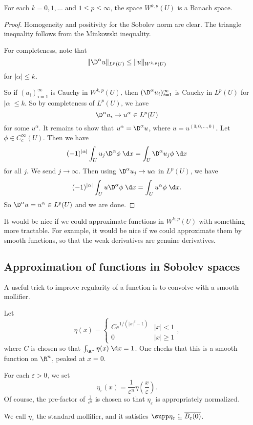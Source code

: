 \documentclass[a4paper]{article}
\begin{document}
\begin{thm}
  For each $k = 0, 1, \ldots$ and $1 \leq p \leq \infty$, the space $W^{k, p}(U)$ is a Banach space.
\end{thm}

\begin{proof}
  Homogeneity and positivity for the Sobolev norm are clear. The triangle inequality follows from the Minkowski inequality.

  For completeness, note that
  \[
    \|\D^\alpha u\|_{L^p(U)} \leq \|u\|_{W^{k, p}(U)}
  \]
  for $|\alpha| \leq k$.

  So if $(u_i)_{i = 1}^\infty$ is Cauchy in $W^{k, p}(U)$, then $(\D^\alpha u_i)_{i = 1}^\infty$ is Cauchy in $L^p(U)$ for $|\alpha| \leq k$. So by completeness of $L^p(U)$, we have
  \[
    \D^{\alpha}u_i \to u^\alpha \in L^p(U)
  \]
  for some $u^\alpha$. It remains to show that $u^\alpha = \D^\alpha u$, where $u = u^{(0, 0, \ldots, 0)}$. Let $\phi \in C_c^\infty(U)$. Then we have
  \[
    (-1)^{|\alpha|} \int_U u_j \D^\alpha \phi \;\d x = \int_U \D^\alpha u_j \phi\;\d x
  \]
  for all $j$. We send $j \to \infty$. Then using $\D^\alpha u_j \to u\alpha$ in $L^p(U)$, we have
  \[
    (-1)^{|\alpha|} \int_U u \D^\alpha \phi\;\d x = \int_U u^\alpha \phi\;\d x.
  \]
  So $\D^\alpha u = u^\alpha \in L^p(U)$ and we are done.
\end{proof}

It would be nice if we could approximate functions in $W^{k, p}(U)$ with something more tractable. For example, it would be nice if we could approximate them by smooth functions, so that the weak derivatives are genuine derivatives.

\subsection{Approximation of functions in Sobolev spaces}
A useful trick to improve regularity of a function is to convolve with a smooth mollifier.
\begin{defi}
  Let
  \[
    \eta(x) =
    \begin{cases}
      C e^{1/(|x|^2 - 1)}& |x| < 1\\
      0 & |x| \geq 1
    \end{cases} ,
  \]
  where $C$ is chosen so that $\int_{\R^n} \eta(x) \;\d x = 1$. One checks that this is a smooth function on $\R^n$, peaked at $x = 0$.

  For each $\varepsilon > 0$, we set
  \[
    \eta_\varepsilon(x) = \frac{1}{\varepsilon^n} \eta\left(\frac{x}{\varepsilon}\right).
  \]
  Of course, the pre-factor of $\frac{1}{\varepsilon^n}$ is chosen so that $\eta_\varepsilon$ is appropriately normalized.

  We call $\eta_\varepsilon$ the standard mollifier, and it satisfies $\supp \eta_\varepsilon \subseteq \overline{B_\varepsilon(0)}$.
\end{defi}
\end{document}
